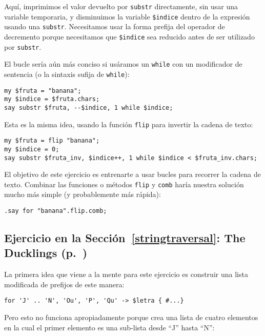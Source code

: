 Aquí, imprimimos el valor devuelto por {\tt substr} directamente,
sin usar una variable temporaria, y disminuimos la variable
\verb|$indice| dentro de la expresión usando una {\tt substr}.
Necesitamos usar la forma prefija del operador de decremento 
porque necesitamos que \verb|$indice| sea reducido antes de 
ser utilizado por {\tt substr}.

El bucle sería aún más conciso si usáramos un {\tt while} 
con un modificador de sentencia (o la sintaxis sufija de {\tt while}):

\begin{verbatim}
my $fruta = "banana";
my $indice = $fruta.chars;
say substr $fruta, --$indice, 1 while $indice;
\end{verbatim}
%

Esta es la misma idea, usando la función {\tt flip} 
para invertir la cadena de texto:

\begin{verbatim}
my $fruta = flip "banana";
my $indice = 0;
say substr $fruta_inv, $indice++, 1 while $indice < $fruta_inv.chars;
\end{verbatim}
%

El objetivo de este ejercicio es entrenarte a usar bucles para
recorrer la cadena de texto. Combinar las funciones o métodos 
{\tt flip} y {\tt comb} haría nuestra solución mucho más simple 
(y probablemente más rápida):

\begin{verbatim}
.say for "banana".flip.comb;
\end{verbatim}


\subsection{Ejercicio en la Sección~\ref{stringtraversal}: The Ducklings (p.~\pageref{stringtraversal})}
\label{sol_ducklings}

La primera idea que viene a la mente para este ejercicio es 
construir una lista modificada de prefijos de este manera:

\begin{verbatim}
for 'J' .. 'N', 'Ou', 'P', 'Qu' -> $letra { #...}
\end{verbatim}
%

Pero esto no funciona apropiadamente porque crea una lista de
cuatro elementos en la cual el primer elemento es una 
sub-lista desde ``J'' hasta ``N'':

